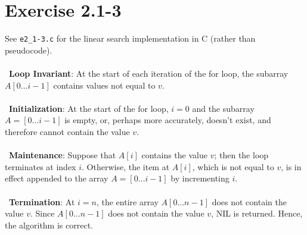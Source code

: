 \documentclass{article}
\begin{document}
\section*{Exercise 2.1-3}

See \texttt{e2\_1-3.c} for the linear search implementation in C (rather than pseudocode).
\\ \\
\noindent~\textbf{Loop Invariant}: At the start of each iteration of the for loop, the subarray $A[0 \ldots i-1]$ contains values not equal to $v$.
\\ \\
\noindent~\textbf{Initialization}: At the start of the for loop, $i=0$ and the subarray $A=[0 \ldots i-1]$ is empty, or, perhaps more accurately, doesn't exist, and therefore cannot contain the value $v$.
\\ \\
\noindent~\textbf{Maintenance}: Suppose that $A[i]$ contains the value $v$; then the loop terminates at index $i$. Otherwise, the item at $A[i]$, which is not equal to $v$, is in effect appended to the array $A=[0 \ldots i-1]$ by incrementing $i$.
\\ \\
\noindent~\textbf{Termination}: At $i=n$, the entire array $A[0 \ldots n-1]$ does not contain the value $v$. Since $A[0 \ldots n-1]$ does not contain the value $v$, NIL is returned. Hence, the algorithm is correct.
\end{document}
